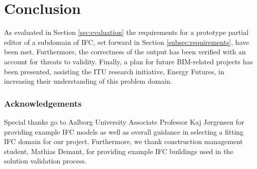 \section{Conclusion}
\label{sec:conclusion}
As evaluated in Section \ref{sec:evaluation} the requirements for a prototype partial editor of a subdomain of IFC, set forward in Section \ref{subsec:requirements}, have been met. Furthermore, the correctness of the output has been verified with an account for threats to validity. Finally, a plan for future BIM-related projects has been presented, assisting the ITU research initiative, Energy Futures, in increasing their understanding of this problem domain.

\subsubsection{Acknowledgements} Special thanks go to Aalborg University Associate Professor Kaj Jørgensen for providing example IFC models as well as overall guidance in selecting a fitting IFC domain for our project. Furthermore, we thank construction management student, Mathias Demant, for providing example IFC buildings used in the solution validation process.